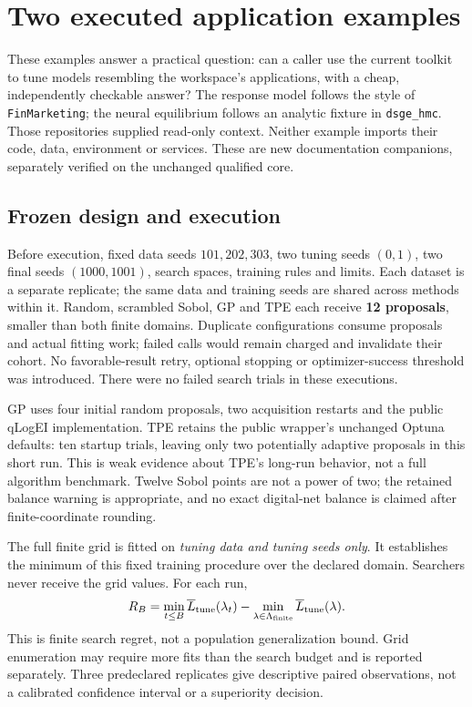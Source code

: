 \chapter{Two executed application examples}
\label{sec:worked-applications}

These examples answer a practical question: can a caller use the current
toolkit to tune models resembling the workspace's applications, with a cheap,
independently checkable answer? The response model follows the style of
\texttt{FinMarketing}; the neural equilibrium follows an analytic fixture in
\texttt{dsge\_hmc}. Those repositories supplied read-only context. Neither
example imports their code, data, environment or services. These are new
documentation companions, separately verified on the unchanged qualified core.

\section{Frozen design and execution}

Before execution,  fixed data seeds
$101,202,303$, two tuning seeds $(0,1)$, two final seeds $(1000,1001)$,
search spaces, training rules and limits. Each dataset is a separate replicate;
the same data and training seeds are shared across methods within it. Random,
scrambled Sobol, GP and TPE each receive \textbf{12 proposals}, smaller than
both finite domains. Duplicate configurations consume proposals and actual
fitting work; failed calls would remain charged and invalidate their cohort.
No favorable-result retry, optional stopping or optimizer-success threshold was
introduced. There were no failed search trials in these executions.

GP uses four initial random proposals, two acquisition restarts and the public
qLogEI implementation. TPE retains the public wrapper's unchanged Optuna
defaults: ten startup trials, leaving only two potentially adaptive proposals
in this short run. This is weak evidence about TPE's long-run behavior, not a
full algorithm benchmark. Twelve Sobol points are not a power of two; the
retained balance warning is appropriate, and no exact digital-net balance is
claimed after finite-coordinate rounding.

The full finite grid is fitted on \emph{tuning data and tuning seeds only}.
It establishes the minimum of this fixed training procedure over the declared
domain. Searchers never receive the grid values. For each run,
\[
 R_B=\min_{t\le B}\overline L_{\rm tune}(\lambda_t)
       -\min_{\lambda\in\Lambda_{\rm finite}}
          \overline L_{\rm tune}(\lambda).
\]
This is finite search regret, not a population generalization bound. Grid
enumeration may require more fits than the search budget and is reported
separately. Three predeclared replicates give descriptive paired observations,
not a calibrated confidence interval or a superiority decision.

